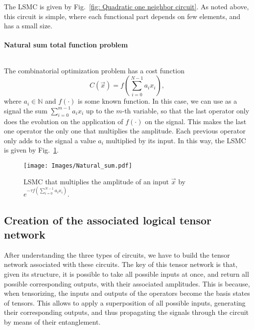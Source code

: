 The LSMC is given by Fig.~\ref{fig: Quadratic one neighbor circuit}. As noted above, this circuit is simple, where each functional part depends on few elements, and has a small size.


\paragraph{Natural sum total function problem}
$ $

The combinatorial optimization problem has a cost function
\begin{equation}
    C(\vec{x})=f\left(\sum_{i=0}^{N-1} a_i x_i\right),
\end{equation}
where $a_i\in \mathbb{N}$ and $f(\cdot)$ is some known function. In this case, we can use as a signal the sum $\sum_{i=0}^{m-1} a_i x_i$ up to the $m$-th variable, so that the last operator only does the evolution on the application of $f(\cdot)$ on the signal. This makes the last one operator the only one that multiplies the amplitude. Each previous operator only adds to the signal a value $a_i$ multiplied by its input. In this way, the LSMC is given by Fig.~\ref{fig: Natural sum circuit}.

\begin{figure}
    \centering
    \texttt{[image: Images/Natural\_sum.pdf]}
    \caption{LSMC that multiplies the amplitude of an input $\vec{x}$ by $e^{-\tau f\left(\sum_{i=0}^{N-1} a_i x_i\right)}$.}
    \label{fig: Natural sum circuit}
\end{figure}


\subsection{Creation of the associated logical tensor network}
After understanding the three types of circuits, we have to build the tensor network associated with these circuits. The key of this tensor network is that, given its structure, it is possible to take all possible inputs at once, and return all possible corresponding outputs, with their associated amplitudes. This is because, when tensorizing, the inputs and outputs of the operators become the basis states of tensors. This allows to apply a superposition of all possible inputs, generating their corresponding outputs, and thus propagating the signals through the circuit by means of their entanglement.

